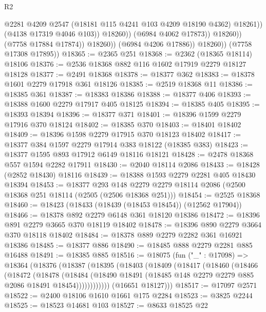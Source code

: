 \begin{lexlean}{R2}
\begin{coremodule}
                                  @2281
                                  @4209
                                  @2547
                                  (@18181 @115 @4241 @103 @4209 @18190 @4362)
                                  @18261))
                              (@4138 @17319 @4046 @103))
                            @18260))
                        (@6984 @4062 @17873))
                      @18260))
                  (@7758 @17884 @17874))
                @18260))
            (@6984 @4206 @17886))
          @18260))
      (@7758 @17308 @17895))
@18365 := @2365 @251
@18368 := @2362 (@18365 @18114) @18106
@18376 := @2536 @18368 @882 @116 @1602 @17919 @2279 @18127 @18128
@18377 := @2491 @18368
@18378 := @18377 @362
@18383 := @18378 @1601 @2279 @17918 @361 @18126
@18385 := @2519 @18368 @11
@18386 := @18385 @361
@18387 := @18383 @18386
@18388 := @18377 @406
@18393 := @18388 @1600 @2279 @17917 @405 @18125
@18394 := @18385 @405
@18395 := @18393 @18394
@18396 := @18377 @371
@18401 := @18396 @1599 @2279 @17916 @370 @18124
@18402 := @18385 @370
@18403 := @18401 @18402
@18409 := @18396 @1598 @2279 @17915 @370 @18123 @18402
@18417 := @18377 @384 @1597 @2279 @17914 @383 @18122 (@18385 @383)
@18423 := @18377 @1595 @893 @17912 @6149 @18116 @18121
@18428 := @2478 @18368 @557 @1594 @2282 @17911
@18430 := @2040 @18114 @2086
@18433 := @18428 (@2852 @18430) @18116
@18439 := @18388 @1593 @2279 @2281 @405 @18430 @18394
@18453 := @18377
    @293
    @148
    @2279
    @2279
    @18114
    @2086
    (@2500 @18368 @251 @18114 (@2505 (@2506 @18368 @251)))
@18454 := @2525 @18368
@18460 := @18423 (@18433 (@18439 (@18453 @18454)) (@12562 @17904))
@18466 := @18378 @892 @2279 @6148 @361 @18120 @18386
@18472 := @18396 @891 @2279 @3665 @370 @18119 @18402
@18478 := @18396 @890 @2279 @3664 @370 @18118 @18402
@18484 := @18378 @889 @2279 @2282 @361 @16921 @18386
@18485 := @18377 @886
@18490 := @18485 @888 @2279 @2281 @885 @16488
@18491 := @18385 @885
@18516 := @18075
    (fun ("_" : @17098) =>
    @18364
      (@18376
        (@18387
          (@18395
            (@18403
              (@18409
                (@18417
                  (@18460
                    (@18466
                      (@18472
                        (@18478
                          (@18484
                            (@18490
                              @18491
                              (@18485 @148 @2279 @2279 @885 @2086 @18491 @18454))))))))))))
        (@16651 @18127)))
@18517 := @17097 @2571
@18522 := @2400 @18106 @1610 @1661 @175 @2284
@18523 := @3825 @2244
@18525 := @18523 @14681 @103
@18527 := @8633 @18525 @22

\end{coremodule}
\end{lexlean}

